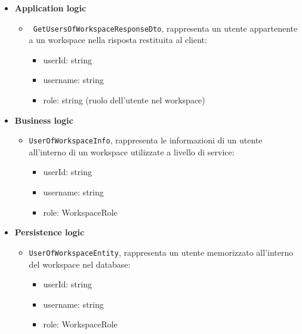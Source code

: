 \documentclass[a4paper, 11pt]{article}
\begin{document}
\begin{itemize}

	\item \textbf{Application logic}
	\begin{itemize}
	
		\item\texttt{ GetUsersOfWorkspaceResponseDto}, rappresenta un utente appartenente a un workspace nella risposta restituita al client:
		\begin{itemize}
			\item userId: string
			\item username: string
			\item role: string (ruolo dell'utente nel workspace)
		\end{itemize}
		
	\end{itemize}
	
	
	\item \textbf{Business logic}
	\begin{itemize}
	
		\item \texttt{UserOfWorkspaceInfo}, rappresenta le informazioni di un utente all'interno di un workspace utilizzate a livello di service:
		\begin{itemize}
			\item userId: string
			\item username: string
			\item role: WorkspaceRole
		\end{itemize}
		
	\end{itemize}
	
	
	\item \textbf{Persistence logic}
	\begin{itemize}
	
		\item \texttt{UserOfWorkspaceEntity}, rappresenta un utente memorizzato all'interno del workspace nel database:
		\begin{itemize}
			\item userId: string
			\item username: string
			\item role: WorkspaceRole
		\end{itemize}
		
	\end{itemize}

\end{itemize}
\end{document}
